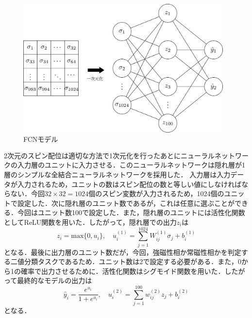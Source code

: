 \documentclass[a4paper,11pt]{jsreport}
\begin{document}
\begin{figure}[H]
  \begin{center}
    \includegraphics[height=7cm]{image/相分類FCNモデル.png}
    \caption{FCNモデル}
    \label{相分類FCNモデル}
  \end{center}
\end{figure}

2次元のスピン配位は適切な方法で1次元化を行ったあとにニューラルネットワークの入力層のユニットに入力させる．このニューラルネットワークは隠れ層が1層のシンプルな全結合ニューラルネットワークを採用した．
入力層は入力データが入力されるため，ユニットの数はスピン配位の数と等しい値にしなければならない．今回$32 \times 32 = 1024$個のスピン変数が入力されるため，1024個のユニットで設定した．次に隠れ層のユニット数であるが，これは任意に選ぶことができる．今回はユニット数100で設定した．また，隠れ層のユニットには活性化関数としてReLU関数を用いた．したがって，隠れ層での出力$z_i$は
\begin{equation}
  z_i 
  = \mathrm{max}\{0,u_i\}, \quad
  u_i^{(1)} = \sum_{j=1}^{1024} W_{ij}^{(1)} \sigma_j + b_i^{(1)}
\end{equation}
となる．最後に出力層のユニット数だが，今回，強磁性相か常磁性相かを判定する二値分類タスクであるため．ユニット数は2で設定する必要がある．また，0から1の確率で出力させるために．活性化関数はシグモイド関数を用いた．したがって最終的なモデルの出力は
\begin{equation}
  \hat{y}_i 
  = \frac{e^{u_i}}{1 + e^{u_i}}, \quad
  u_i^{(2)} = \sum_{j=1}^{100} w_{ij}^{(2)} z_j + b_i^{(2)}
\end{equation}
となる．
\end{document}
